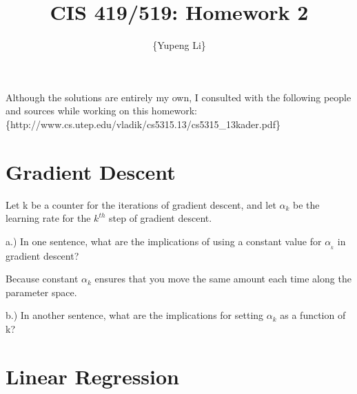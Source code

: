 \documentclass{article}
\title{CIS 419/519: Homework 2}
\author{\{Yupeng Li\}}
\date{}
\begin{document}
    \maketitle
    Although the solutions are entirely my own, I consulted with the following people and sources while working on this homework:
     \{http://www.cs.utep.edu/vladik/cs5315.13/cs5315\_13kader.pdf\}
    
    \section{Gradient Descent}
    
    Let k be a counter for the iterations of gradient descent, and let $\alpha_k$ be the learning rate for the $k^{th}$ step of gradient descent.
    
a.) In one sentence, what are the implications of using a constant value for $\alpha__{k}$ in gradient descent?

Because constant $\alpha_{k}$ ensures that you move the same amount each time along the parameter space.

b.) In another sentence, what are the implications for setting $\alpha_{k}$ as a function of k?

    
    
    \section{Linear Regression}


        
        
\end{document}
